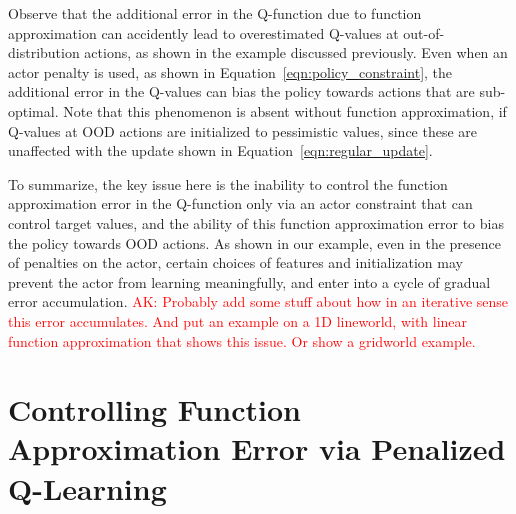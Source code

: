 Observe that the additional error in the Q-function due to function approximation can accidently lead to overestimated Q-values at out-of-distribution actions, as shown in the example discussed previously. Even when an actor penalty is used, as shown in Equation~\ref{eqn:policy_constraint}, the additional error in the Q-values can bias the policy towards actions that are sub-optimal. Note that this phenomenon is absent without function approximation, if Q-values at OOD actions are initialized to pessimistic values, since these are unaffected with the update shown in Equation~\ref{eqn:regular_update}. 

To summarize, the key issue here is the inability to control the function approximation error in the Q-function only via an actor constraint that can control target values, and the ability of this function approximation error to bias the policy towards OOD actions. As shown in our example, even in the presence of penalties on the actor, certain choices of features and initialization may prevent the actor from learning meaningfully, and enter into a cycle of gradual error accumulation. 
\textcolor{red}{AK: Probably add some stuff about how in an iterative sense this error accumulates. And put an example on a 1D lineworld, with linear function approximation that shows this issue. Or show a gridworld example.}


\section{Controlling Function Approximation Error via Penalized Q-Learning}

